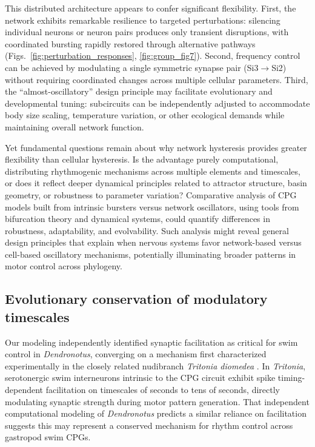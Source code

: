 \documentclass[nofootinbib,aip,amsmath,amssymb,preprint,twocolumn,floatfix,10pt]{revtex4-2}
\begin{document}
This distributed architecture appears to confer significant flexibility. First, the network exhibits remarkable resilience to targeted perturbations: silencing individual neurons or neuron pairs produces only transient disruptions, with coordinated bursting rapidly restored through alternative pathways (Figs.~\ref{fig:perturbation_responses}, \ref{fig:group_fig7}). Second, frequency control can be achieved by modulating a single symmetric synapse pair (Si3$\to$Si2) without requiring coordinated changes across multiple cellular parameters. Third, the ``almost-oscillatory'' design principle may facilitate evolutionary and developmental tuning: subcircuits can be independently adjusted to accommodate body size scaling, temperature variation, or other ecological demands while maintaining overall network function.

Yet fundamental questions remain about why network hysteresis provides greater flexibility than cellular hysteresis. Is the advantage purely computational, distributing rhythmogenic mechanisms across multiple elements and timescales, or does it reflect deeper dynamical principles related to attractor structure, basin geometry, or robustness to parameter variation? Comparative analysis of CPG models built from intrinsic bursters versus network oscillators, using tools from bifurcation theory and dynamical systems, could quantify differences in robustness, adaptability, and evolvability. Such analysis might reveal general design principles that explain when nervous systems favor network-based versus cell-based oscillatory mechanisms, potentially illuminating broader patterns in motor control across phylogeny.

\subsection{Evolutionary conservation of modulatory timescales}

Our modeling independently identified synaptic facilitation as critical for swim control in \textit{Dendronotus}, converging on a mechanism first characterized experimentally in the closely related nudibranch \textit{Tritonia diomedea} \cite{katz1994dynamic, sakurai2003spike}. In \textit{Tritonia}, serotonergic swim interneurons intrinsic to the CPG circuit exhibit spike timing-dependent facilitation on timescales of seconds to tens of seconds, directly modulating synaptic strength during motor pattern generation. That independent computational modeling of \textit{Dendronotus} predicts a similar reliance on facilitation suggests this may represent a conserved mechanism for rhythm control across gastropod swim CPGs.
\end{document}
